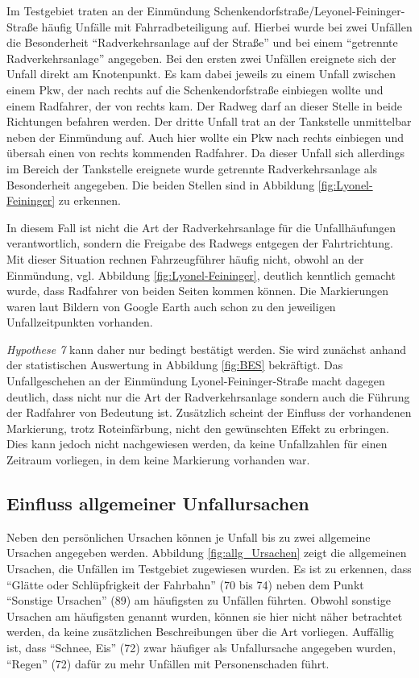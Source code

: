 Im Testgebiet traten an der Einmündung Schenkendorfstraße/Leyonel-Feininger-Straße häufig Unfälle mit Fahrradbeteiligung auf. Hierbei wurde bei zwei Unfällen die Besonderheit \enquote{Radverkehrsanlage auf der Straße} und bei einem \enquote{getrennte Radverkehrsanlage} angegeben. Bei den ersten zwei Unfällen ereignete sich der Unfall direkt am Knotenpunkt. Es kam dabei jeweils zu einem Unfall zwischen einem Pkw, der nach rechts auf die Schenkendorfstraße einbiegen wollte und einem Radfahrer, der von rechts kam. Der Radweg darf an dieser Stelle in beide Richtungen befahren werden. Der dritte Unfall trat an der Tankstelle unmittelbar neben der Einmündung auf. Auch hier wollte ein Pkw nach rechts einbiegen und übersah einen von rechts kommenden Radfahrer. Da dieser Unfall sich allerdings im Bereich der Tankstelle ereignete wurde getrennte Radverkehrsanlage als Besonderheit angegeben. Die beiden Stellen sind in Abbildung \ref{fig:Lyonel-Feininger} zu erkennen.

In diesem Fall ist nicht die Art der Radverkehrsanlage für die Unfallhäufungen verantwortlich, sondern die Freigabe des Radwegs entgegen der Fahrtrichtung. Mit dieser Situation rechnen Fahrzeugführer häufig nicht, obwohl an der Einmündung, vgl. Abbildung \ref{fig:Lyonel-Feininger}, deutlich kenntlich gemacht wurde, dass Radfahrer von beiden Seiten kommen können. Die Markierungen waren laut Bildern von Google Earth auch schon zu den jeweiligen Unfallzeitpunkten vorhanden.

\textit{Hypothese 7} kann daher nur bedingt bestätigt werden. Sie wird zunächst anhand der statistischen Auswertung in Abbildung \ref{fig:BES} bekräftigt. Das Unfallgeschehen an der Einmündung Lyonel-Feininger-Straße macht dagegen deutlich, dass nicht nur die Art der Radverkehrsanlage sondern auch die Führung der Radfahrer von Bedeutung ist. Zusätzlich scheint der Einfluss der vorhandenen Markierung, trotz Roteinfärbung, nicht den gewünschten Effekt zu erbringen. Dies kann jedoch nicht nachgewiesen werden, da keine Unfallzahlen für einen Zeitraum vorliegen, in dem keine Markierung vorhanden war. 


\subsection{Einfluss allgemeiner Unfallursachen}
Neben den persönlichen Ursachen können je Unfall bis zu zwei allgemeine Ursachen angegeben werden. Abbildung \ref{fig:allg_Ursachen} zeigt die allgemeinen Ursachen, die Unfällen im Testgebiet zugewiesen wurden. Es ist zu erkennen, dass \enquote{Glätte oder Schlüpfrigkeit der Fahrbahn} (70 bis 74) neben dem Punkt \enquote{Sonstige Ursachen} (89) am häufigsten zu Unfällen führten. Obwohl sonstige Ursachen am häufigsten genannt wurden, können sie hier nicht näher betrachtet werden, da keine zusätzlichen Beschreibungen über die Art vorliegen. Auffällig ist, dass \enquote{Schnee, Eis} (72) zwar häufiger als Unfallursache angegeben wurden, \enquote{Regen} (72) dafür zu mehr Unfällen mit Personenschaden führt. 

